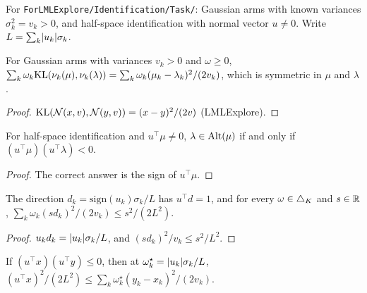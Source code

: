 For \texttt{ForLMLExplore/Identification/Task/}: Gaussian arms with known variances $\sigma_k^2 =
v_k > 0$, and half-space identification with normal vector $u \ne 0$. Write $L = \sum_k \lvert u_k \rvert
\sigma_k$.

\begin{lemma}
  \label{lem:cost_gaussianReal}
  \leanok
  For Gaussian arms with variances $v_k > 0$ and $\omega \ge 0$,
  $\sum_k \omega_k \mathrm{KL}(\nu_k(\mu), \nu_k(\lambda)) = \sum_k \omega_k (\mu_k - \lambda_k)^2 / (2
  v_k)$, which is symmetric in $\mu$ and $\lambda$.
\end{lemma}

\begin{proof}
  \leanok
  $\mathrm{KL}(\mathcal N(x, v), \mathcal N(y, v)) = (x - y)^2 / (2 v)$ (LMLExplore).
\end{proof}

\begin{lemma}
  \label{lem:alternatives_halfSpace}
  \leanok
  For half-space identification and $u^{\top} \mu \ne 0$, $\lambda \in \mathrm{Alt}(\mu)$ if and only if
  $(u^{\top} \mu)(u^{\top} \lambda) < 0$.
\end{lemma}

\begin{proof}
  \leanok
  The correct answer is the sign of $u^{\top} \mu$.
\end{proof}

\begin{lemma}
  \label{lem:halfspace_direction}
  \leanok
  The direction $d_k = \mathrm{sign}(u_k) \sigma_k / L$ has $u^{\top} d = 1$, and for every $\omega
  \in \triangle_K$ and $s \in \mathbb{R}$, $\sum_k \omega_k (s d_k)^2 / (2 v_k) \le s^2 / (2 L^2)$.
\end{lemma}

\begin{proof}
  \leanok
  $u_k d_k = \lvert u_k \rvert \sigma_k / L$, and $(s d_k)^2 / v_k \le s^2 / L^2$.
\end{proof}

\begin{lemma}
  \label{lem:halfspace_cauchy_schwarz}
  \leanok
  If $(u^{\top} x)(u^{\top} y) \le 0$, then at $\omega^{\star}_k = \lvert u_k \rvert \sigma_k / L$,
  $(u^{\top} x)^2 / (2 L^2) \le \sum_k \omega^{\star}_k (y_k - x_k)^2 / (2 v_k)$.
\end{lemma}

